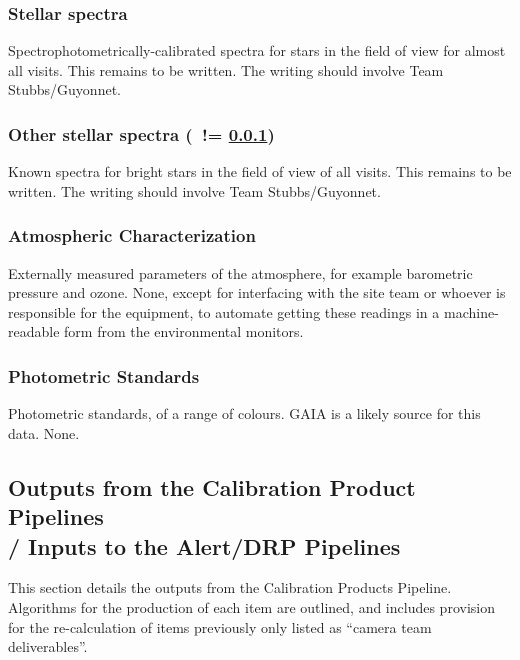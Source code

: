 \subsubsection{Stellar spectra}\label{sec:calibInputs:starSpectrum} 
Spectrophotometrically-calibrated spectra for stars in the field of view for almost all visits.
\alg \xxx This remains to be written. The writing should involve Team Stubbs/Guyonnet.


\subsubsection{Other stellar spectra (\nb~!= \ref{sec:calibInputs:starSpectrum})}\label{sec:calibInputs:standardStarSpectrum}
Known spectra for bright stars in the field of view of all visits.
\alg \xxx This remains to be written. The writing should involve Team Stubbs/Guyonnet.


\subsubsection{Atmospheric Characterization}\label{sec:calibInputs:atmosphericData}
Externally measured parameters of the atmosphere, for example barometric pressure and ozone.
\alg None, except for interfacing with the site team or whoever is responsible for the equipment, to automate getting these readings in a machine-readable form from the environmental monitors.


\subsubsection{Photometric Standards}\label{sec:calibInputs:photometricStandards} 
Photometric standards, of a range of colours. GAIA is a likely source for this data.
\alg None.



\subsection{Outputs from the Calibration Product Pipelines \\
	/ Inputs to the Alert/DRP Pipelines}
\label{sec:calibProducts}

This section details the outputs from the Calibration Products Pipeline. Algorithms for the production of each item are outlined, and includes provision for the re-calculation of items previously only listed as ``camera team deliverables''.

